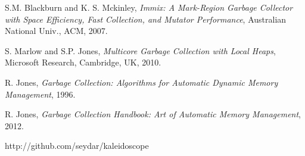 \documentclass{article}
\begin{document}
  \begin{thebibliography}{1}
     S.M. Blackburn and K. S. Mckinley,
    \emph{Immix: A Mark-Region Garbage Collector
    with Space Efficiency, Fast Collection, and Mutator Performance},
    Australian National Univ., ACM, 2007.

     S. Marlow and S.P. Jones,
    \emph{Multicore Garbage Collection with Local Heaps},
    Microsoft Research, Cambridge, UK, 2010.

     R. Jones,
    \emph{Garbage Collection: Algorithms for Automatic Dynamic Memory
    Management},
    1996.

     R. Jones,
    \emph{Garbage Collection Handbook: Art of Automatic Memory Management},
    2012.

     http://github.com/seydar/kaleidoscope
  
  \end{thebibliography}
\end{document}
